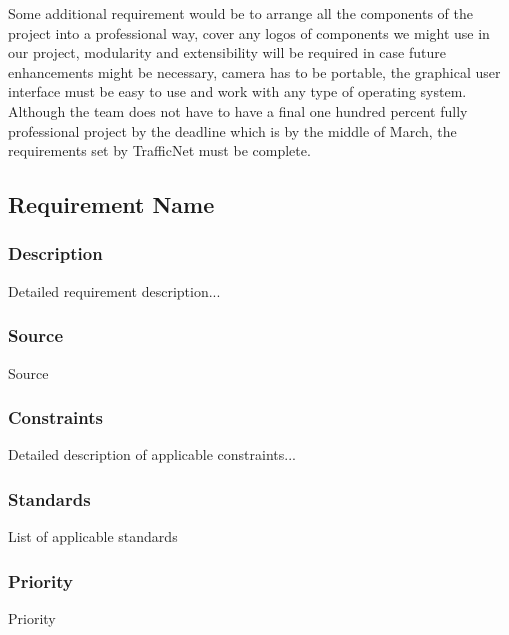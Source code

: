 Some additional requirement would be to arrange all the components of the project into a professional way, cover any logos of components we might use in our project, modularity and extensibility will be required in case future enhancements might be necessary, camera has to be portable, the graphical user interface must be easy to use and work with any type of operating system. Although the team does not have to have a final one hundred percent fully professional project by the deadline which is by the middle of March, the requirements set by TrafficNet must be complete.

\subsection{Requirement Name}
\subsubsection{Description}
Detailed requirement description...
\subsubsection{Source}
Source
\subsubsection{Constraints}
Detailed description of applicable constraints...
\subsubsection{Standards}
List of applicable standards
\subsubsection{Priority}
Priority
